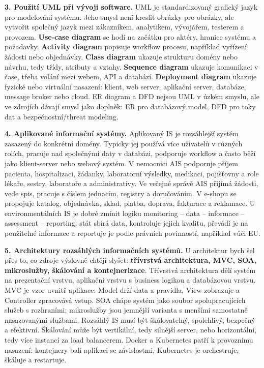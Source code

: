 \begin{greenbox}
\textbf{3. Použití UML při vývoji software.} UML je standardizovaný grafický jazyk pro modelování systému. Jeho smysl není kreslit obrázky pro obrázky, ale vytvořit společný jazyk mezi zákazníkem, analytikem, vývojářem, testerem a provozem. \textbf{Use-case diagram} se hodí na začátku pro aktéry, hranice systému a požadavky. \textbf{Activity diagram} popisuje workflow procesu, například vyřízení žádosti nebo objednávky. \textbf{Class diagram} ukazuje strukturu domény nebo návrhu, tedy třídy, atributy a vztahy. \textbf{Sequence diagram} ukazuje komunikaci v čase, třeba volání mezi webem, API a databází. \textbf{Deployment diagram} ukazuje fyzické nebo virtuální nasazení: klient, web server, aplikační server, databáze, message broker nebo cloud. ER diagram a DFD nejsou UML v úzkém smyslu, ale ve zdrojích dávají smysl jako doplněk: ER pro databázový model, DFD pro toky dat a bezpečnostní/threat modeling.

\textbf{4. Aplikované informační systémy.} Aplikovaný IS je rozsáhlejší systém zasazený do konkrétní domény. Typicky jej používá více uživatelů v různých rolích, pracuje nad společnými daty v databázi, podporuje workflow a často běží jako klient-server nebo webový systém. V nemocnici AIS podporuje příjem pacienta, hospitalizaci, žádanky, laboratorní výsledky, medikaci, pojišťovny a role lékaře, sestry, laboratoře a administrativy. Ve veřejné správě AIS přijímá žádosti, vede spis, pracuje s číslem jednacím, registry a doručováním. V e-shopu se propojuje katalog, objednávka, sklad, platba, doprava, fakturace a reklamace. U environmentálních IS je dobré zmínit logiku monitoring -- data -- informace -- assessment -- reporting: stát sbírá data, kontroluje jejich kvalitu, převádí je na použitelné informace a reportuje je podle právních povinností, například vůči EU.

\textbf{5. Architektury rozsáhlých informačních systémů.} U architektur bych šel přes to, co zdroje výslovně chtějí slyšet: \textbf{třívrstvá architektura, MVC, SOA, mikroslužby, škálování a kontejnerizace}. Třívrstvá architektura dělí systém na prezentační vrstvu, aplikační vrstvu s business logikou a databázovou vrstvu. MVC je vzor uvnitř aplikace: Model drží data a pravidla, View zobrazuje a Controller zpracovává vstup. SOA chápe systém jako soubor spolupracujících služeb s rozhraními; mikroslužby jsou jemnější varianta s menšími samostatně nasazovanými službami. Rozsáhlý IS musí být škálovatelný, spolehlivý, bezpečný a efektivní. Škálování může být vertikální, tedy silnější server, nebo horizontální, tedy více instancí za load balancerem. Docker a Kubernetes patří k provoznímu nasazení: kontejnery balí aplikaci se závislostmi, Kubernetes je orchestruje, škáluje a restartuje.


\end{greenbox}
